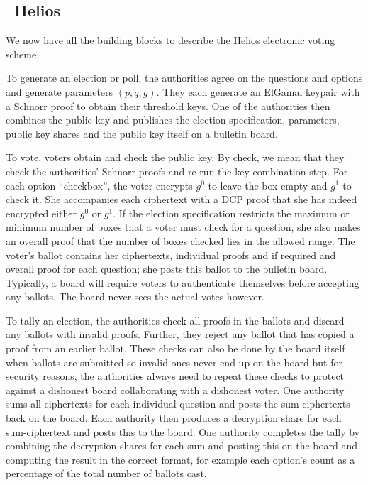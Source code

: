 \documentclass[envcountsame]{llncs}
\begin{document}
\subsection{\Sun\ Helios}

We now have all the building blocks to describe the Helios electronic voting
scheme.

To generate an election or poll, the authorities agree on the questions and
options and generate parameters $(p, q, g)$. They each generate an ElGamal
keypair with a Schnorr proof to obtain their threshold keys. One of the
authorities then combines the public key and publishes the election
specification, parameters, public key shares and the public key itself on a
bulletin board.

To vote, voters obtain and check the public key. By check, we mean that they
check the authorities' Schnorr proofs and re-run the key combination step.
For each option ``checkbox'', the voter encrypts $g^0$ to leave the box empty
and $g^1$ to check it. She accompanies each ciphertext with a DCP proof that she
has indeed encrypted either $g^0$ or $g^1$. If the election specification
restricts the maximum or minimum number of boxes that a voter must check for a
question, she also makes an overall proof that the number of boxes checked lies
in the allowed range. The voter's ballot contains her ciphertexts, individual
proofs and if required and overall proof for each question; she posts this
ballot to the bulletin board. Typically, a board will require voters to
authenticate themselves before accepting any ballots. The board never sees the
actual votes however.

To tally an election, the authorities check all proofs in the ballots and
discard any ballots with invalid proofs. Further, they reject any ballot that
has copied a proof from an earlier ballot\footnotemark. These checks can also
be done by the board itself when ballots are submitted so invalid ones never end
up on the board but for security reasons, the authorities always need to
repeat these checks to protect against a dishonest board collaborating with a
dishonest voter.
One authority sums all ciphertexts for each individual question and posts
the sum-ciphertexts back on the board. Each authority then produces a
decryption share for each sum-ciphertext and posts this to the board. One
authority completes the tally by combining the decryption shares for each sum
and posting this on the board and computing the result in the correct format,
for example each option's count as a percentage of the total number of ballots
cast.
\end{document}
